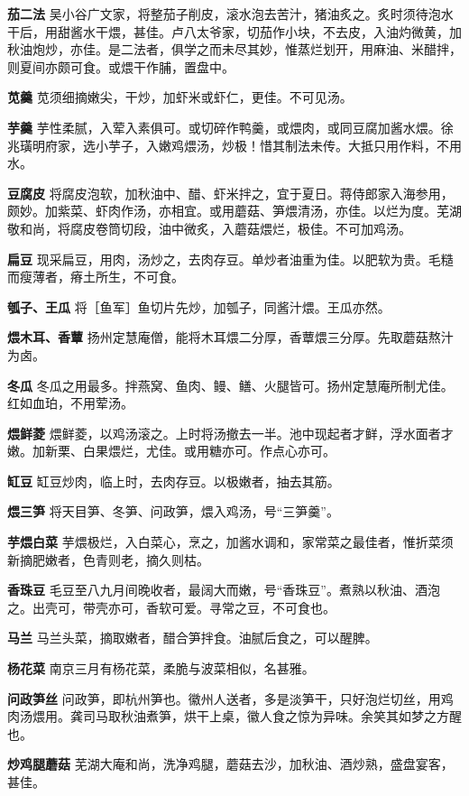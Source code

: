 \documentclass[]{article}
\begin{document}
\textbf{茄二法}
吴小谷广文家，将整茄子削皮，滚水泡去苦汁，猪油炙之。炙时须待泡水干后，用甜酱水干煨，甚佳。卢八太爷家，切茄作小块，不去皮，入油灼微黄，加秋油炮炒，亦佳。是二法者，俱学之而未尽其妙，惟蒸烂划开，用麻油、米醋拌，则夏间亦颇可食。或煨干作脯，置盘中。

\textbf{苋羹} 苋须细摘嫩尖，干炒，加虾米或虾仁，更佳。不可见汤。

\textbf{芋羹}
芋性柔腻，入荤入素俱可。或切碎作鸭羹，或煨肉，或同豆腐加酱水煨。徐兆璜明府家，选小芋子，入嫩鸡煨汤，炒极！惜其制法未传。大抵只用作料，不用水。

\textbf{豆腐皮}
将腐皮泡软，加秋油中、醋、虾米拌之，宜于夏日。蒋侍郎家入海参用，颇妙。加紫菜、虾肉作汤，亦相宜。或用蘑菇、笋煨清汤，亦佳。以烂为度。芜湖敬和尚，将腐皮卷筒切段，油中微炙，入蘑菇煨烂，极佳。不可加鸡汤。

\textbf{扁豆}
现采扁豆，用肉，汤炒之，去肉存豆。单炒者油重为佳。以肥软为贵。毛糙而瘦薄者，瘠土所生，不可食。

\textbf{瓠子、王瓜} 将［鱼军］鱼切片先炒，加瓠子，同酱汁煨。王瓜亦然。

\textbf{煨木耳、香蕈}
扬州定慧庵僧，能将木耳煨二分厚，香蕈煨三分厚。先取蘑菇熬汁为卤。

\textbf{冬瓜}
冬瓜之用最多。拌燕窝、鱼肉、鳗、鳝、火腿皆可。扬州定慧庵所制尤佳。红如血珀，不用荤汤。

\textbf{煨鲜菱}
煨鲜菱，以鸡汤滚之。上时将汤撤去一半。池中现起者才鲜，浮水面者才嫩。加新栗、白果煨烂，尤佳。或用糖亦可。作点心亦可。

\textbf{缸豆} 缸豆炒肉，临上时，去肉存豆。以极嫩者，抽去其筋。

\textbf{煨三笋} 将天目笋、冬笋、问政笋，煨入鸡汤，号``三笋羹''。

\textbf{芋煨白菜}
芋煨极烂，入白菜心，烹之，加酱水调和，家常菜之最佳者，惟折菜须新摘肥嫩者，色青则老，摘久则枯。

\textbf{香珠豆}
毛豆至八九月间晚收者，最阔大而嫩，号``香珠豆''。煮熟以秋油、酒泡之。出壳可，带壳亦可，香软可爱。寻常之豆，不可食也。

\textbf{马兰} 马兰头菜，摘取嫩者，醋合笋拌食。油腻后食之，可以醒脾。

\textbf{杨花菜} 南京三月有杨花菜，柔脆与波菜相似，名甚雅。

\textbf{问政笋丝}
问政笋，即杭州笋也。徽州人送者，多是淡笋干，只好泡烂切丝，用鸡肉汤煨用。龚司马取秋油煮笋，烘干上桌，徽人食之惊为异味。余笑其如梦之方醒也。

\textbf{炒鸡腿蘑菇}
芜湖大庵和尚，洗净鸡腿，蘑菇去沙，加秋油、酒炒熟，盛盘宴客，甚佳。
\end{document}

